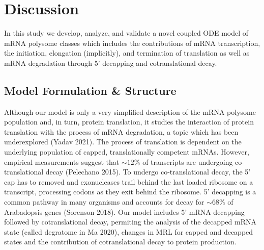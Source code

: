 \documentclass[review]{elsarticle}
\newcommand\mmpar[1]{\marginpar{\begin{spacing}{0.7}\raggedright \singlespacing \tiny \textbf{M:} #1 \end{spacing}}}  %
\newcommand\rmpar[1]{\marginpar{\begin{spacing}{0.7}\raggedright \singlespacing \tiny \textbf{R:} #1 \end{spacing}}}  %
\begin{document}
\section{Discussion}

In this study we develop, analyze, and validate a novel coupled ODE model of mRNA polysome classes %
which includes the contributions of mRNA transcription, the initiation, elongation (implicitly), and termination of translation as well as mRNA degradation through 5' decapping and cotranslational decay.
\subsection{Model Formulation \& Structure}

Although our model is only a very simplified description of the mRNA polysome population and, in turn, protein translation, it studies the interaction of protein translation with the process of mRNA degradation, a topic which has been underexplored (Yadav 2021). The process of translation is dependent on the underlying population of capped, translationally competent mRNAs. However, empirical measurements suggest that $\sim 12\%$ of transcripts are undergoing co-translational decay (Pelechano 2015). To undergo co-translational decay, the 5' cap has to removed and exonucleases trail behind the last loaded ribosome on a transcript, processing codons as they exit behind the ribosome. 5' decapping is a common pathway in many organisms and accounts for decay for $\sim 68\%$ of Arabadopsis genes (Sorenson 2018).
Our model includes 5' mRNA decapping followed by cotranslational decay, permiting the analysis of the decapped mRNA state (called degratome in Ma 2020), changes in MRL for capped and decapped states and the contribution of cotranslational decay to protein production.
\end{document}
